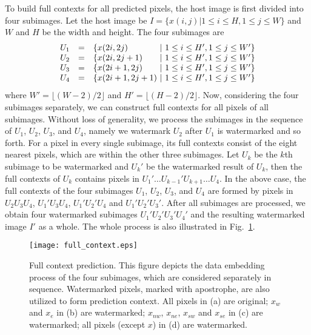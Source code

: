 \documentclass[journal]{IEEEtran}
\begin{document}
To build full contexts for all predicted pixels, the host image is first divided into four
subimages. Let the host image be $I = \{x(i,j) | 1 \le i \le H, 1 \le j \le W\}$ and $W$ and $H$ be
the width and height. The four subimages are
\begin{equation}
    \begin{array}{l@{\quad=\quad}l@{\ |\ }l}
	U_1 & \{x(2i,2j) & 1 \le i \le H', 1 \le j \le W' \} \\ 
	U_2 & \{x(2i,2j+1) & 1 \le i \le H', 1 \le j \le W' \} \\ 
	U_3 & \{x(2i+1,2j) & 1 \le i \le H', 1 \le j \le W' \} \\ 
	U_4 & \{x(2i+1,2j+1) & 1 \le i \le H', 1 \le j \le W' \} \\ 
    \end{array}
\end{equation}
where $W'=\lfloor (W-2)/2 \rfloor$ and $H'=\lfloor (H-2)/2 \rfloor$. Now, considering the four
subimages separately, we can construct full contexts for all pixels of all subimages. Without loss
of generality, we process the subimages in the sequence of $U_1$, $U_2$, $U_3$, and $U_4$, namely we
watermark $U_2$ after $U_1$ is watermarked and so forth. For a pixel in every single subimage, its
full contexts consist of the eight nearest pixels, which are within the other three subimages. Let
$U_k$ be the $k$th subimage to be watermarked and $U_k'$ be the watermarked result of $U_k$, then
the full contexts of $U_k$ contains pixels in $U_1'\dots U_{k-1}'U_{k+1} \dots U_4$. In the above
case, the full contexts of the four subimages $U_1$, $U_2$, $U_3$, and $U_4$ are formed by pixels in
$U_2 U_3 U_4$, $U_1' U_3 U_4$, $U_1' U_2' U_4$ and $U_1' U_2' U_3'$. After all subimages are
processed, we obtain four watermarked subimages $U_1'U_2'U_3'U_4'$ and the resulting watermarked
image $I'$ as a whole. The whole process is also illustrated in Fig.\ \ref{fig:fullctx}.

\begin{figure}[t]
    \centering
    \texttt{[image: full\_context.eps]}
    \caption{\label{fig:fullctx}Full context prediction. This figure depicts the data embedding
    process of the four subimages, which are considered separately in sequence. Watermarked pixels,
    marked with apostrophe, are also utilized to form prediction context. All pixels in (a) are
    original; $x_w$ and $x_e$ in (b) are watermarked; $x_{nw}$, $x_{ne}$, $x_{sw}$ and $x_{se}$ in
    (c) are watermarked; all pixels (except $x$) in (d) are watermarked. }
\end{figure}
\end{document}
